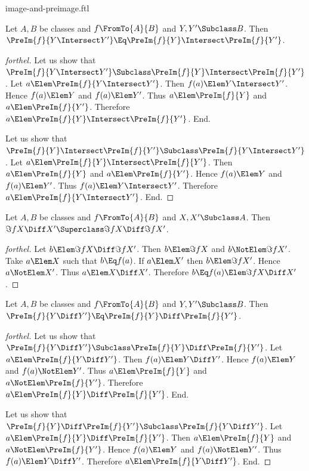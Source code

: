 \documentclass{stex}
\begin{document}
\begin{smodule}{image-and-preimage.ftl}
\begin{proposition*}[forthel]
  Let $A, B$ be classes and $f \FromTo{A}{B}$ and $Y, Y' \Subclass B$.
  Then $\PreIm{f}{Y \Intersect Y'} \Eq \PreIm{f}{Y} \Intersect \PreIm{f}{Y'}$.
\end{proposition*}
\begin{proof}[forthel]
  Let us show that $\PreIm{f}{Y \Intersect Y'} \Subclass \PreIm{f}{Y} \Intersect \PreIm{f}{Y'}$.
    Let $a \Elem \PreIm{f}{Y \Intersect Y'}$.
    Then $f(a) \Elem Y \Intersect Y'$.
    Hence $f(a) \Elem Y$ and $f(a) \Elem Y'$.
    Thus $a \Elem \PreIm{f}{Y}$ and $a \Elem \PreIm{f}{Y'}$.
    Therefore $a \Elem \PreIm{f}{Y} \Intersect \PreIm{f}{Y'}$.
  End.

  Let us show that $\PreIm{f}{Y} \Intersect \PreIm{f}{Y'} \Subclass \PreIm{f}{Y \Intersect Y'}$.
    Let $a \Elem \PreIm{f}{Y} \Intersect \PreIm{f}{Y'}$.
    Then $a \Elem \PreIm{f}{Y}$ and $a \Elem \PreIm{f}{Y'}$.
    Hence $f(a) \Elem Y$ and $f(a) \Elem Y'$.
    Thus $f(a) \Elem Y \Intersect Y'$.
    Therefore $a \Elem \PreIm{f}{Y \Intersect Y'}$.
  End.
\end{proof}

\begin{proposition*}[forthel]
  Let $A, B$ be classes and $f \FromTo{A}{B}$ and $X, X' \Subclass A$.
  Then $\Im{f}{X \Diff X'} \Superclass \Im{f}{X} \Diff \Im{f}{X'}$.
\end{proposition*}
\begin{proof}[forthel]
  Let $b \Elem \Im{f}{X} \Diff \Im{f}{X'}$.
  Then $b \Elem \Im{f}{X}$ and $b \NotElem \Im{f}{X'}$.
  Take $a \Elem X$ such that $b \Eq f(a)$.
  If $a \Elem X'$ then $b \Elem \Im{f}{X'}$.
  Hence $a \NotElem X'$.
  Thus $a \Elem X \Diff X'$.
  Therefore $b \Eq f(a) \Elem \Im{f}{X \Diff X'}$.
\end{proof}

\begin{proposition*}[forthel]
  Let $A, B$ be classes and $f \FromTo{A}{B}$ and $Y, Y' \Subclass B$.
  Then $\PreIm{f}{Y \Diff Y'} \Eq \PreIm{f}{Y} \Diff \PreIm{f}{Y'}$.
\end{proposition*}
\begin{proof}[forthel]
  Let us show that $\PreIm{f}{Y \Diff Y'} \Subclass \PreIm{f}{Y} \Diff \PreIm{f}{Y'}$.
    Let $a \Elem \PreIm{f}{Y \Diff Y'}$.
    Then $f(a) \Elem Y \Diff Y'$.
    Hence $f(a) \Elem Y$ and $f(a) \NotElem Y'$.
    Thus $a \Elem \PreIm{f}{Y}$ and $a \NotElem \PreIm{f}{Y'}$.
    Therefore $a \Elem \PreIm{f}{Y} \Diff \PreIm{f}{Y'}$.
  End.

  Let us show that $\PreIm{f}{Y} \Diff \PreIm{f}{Y'} \Subclass \PreIm{f}{Y \Diff Y'}$.
    Let $a \Elem \PreIm{f}{Y} \Diff \PreIm{f}{Y'}$.
    Then $a \Elem \PreIm{f}{Y}$ and $a \NotElem \PreIm{f}{Y'}$.
    Hence $f(a) \Elem Y$ and $f(a) \NotElem Y'$.
    Thus $f(a) \Elem Y \Diff Y'$.
    Therefore $a \Elem \PreIm{f}{Y \Diff Y'}$.
  End.
\end{proof}

\end{smodule}
\end{document}

